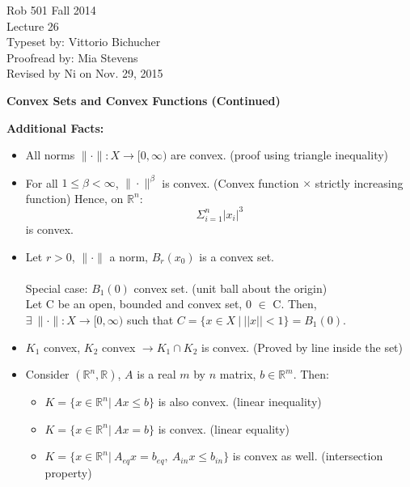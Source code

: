 \documentclass[letterpaper]{article}
\begin{document}
\baselineskip=48pt  %

\setlength{\parskip}{.3in}
\setlength{\itemsep}{.3in}

\pagestyle{plain}

{\Large \bf
\begin{center}
Rob 501 Fall 2014\\
Lecture 26\\
Typeset by:  Vittorio Bichucher\\
Proofread by: Mia Stevens\\
Revised by Ni on Nov. 29, 2015
\end{center}
}

\Large

\begin{center}\textbf{Convex Sets and Convex Functions (Continued)}\end{center}

\noindent \textbf{Additional Facts:}~
    \begin{itemize}
        \item All norms $\|\cdot\|:X\rightarrow [0, \infty)$ are convex. (proof using triangle inequality)
        \item For all $1\leq\beta<\infty$, $\|\cdot\|^\beta$ is convex. (Convex function $\times$ strictly increasing function) Hence, on $\mathbb{R}^n$:
		    \begin{equation*}
        	    \Sigma_{i=1}^{n}|x_i|^3
            \end{equation*}
            is convex.
        \item Let $r>0$, $\|\cdot\|$ a norm, $B_r(x_0)$ is a convex set.\\ \\
            Special case: $B_1(0)$ convex set. (unit ball about the origin)\\
            Let C be an open, bounded and convex set, 0 $\in$ C. Then, $\exists\ \|\cdot\|: X \rightarrow [0,\infty)$ such that $C=\{x\in X\ |\:||x||<1\} = B_1(0)$.
        \item $K_1$ convex, $K_2$ convex $\rightarrow K_1 \cap K_2$ is convex. (Proved by line inside the set)
        \item Consider $(\mathbb{R}^n, \mathbb{R})$, $A$ is a real $m$ by $n$ matrix, $b\in \mathbb{R}^m$. Then:
        \begin{itemize}
            \item $K=\{x \in \mathbb{R}^n|\:Ax\leq b\}$ is also convex. (linear inequality)
            \item $K=\{x \in \mathbb{R}^n|\:Ax=b\}$ is convex. (linear equality)
            \item $K=\{x \in \mathbb{R}^n|\:A_{eq}x=b_{eq},\ A_{in}x\leq b_{in}\}$ is convex as well. (intersection property)
        \end{itemize}
    \end{itemize}
\end{document}
